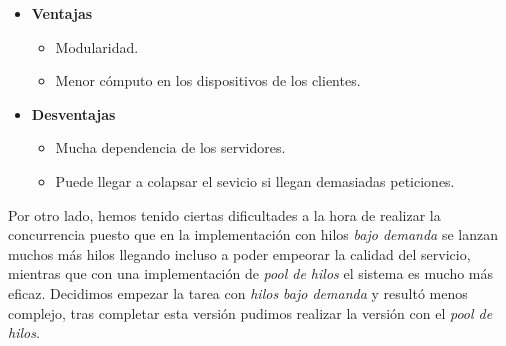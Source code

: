 \documentclass[10pt, spanish, pdftex]{template/UC3M_document}
\begin{document}
\begin{itemize}
  \item \textbf{Ventajas}
    \begin{itemize}
      \item Modularidad.
      \item Menor cómputo en los dispositivos de los clientes.
    \end{itemize}
  \item \textbf{Desventajas}
  \begin{itemize}
    \item Mucha dependencia de los servidores.
    \item Puede llegar a colapsar el sevicio si llegan demasiadas peticiones.
  \end{itemize}
\end{itemize}

Por otro lado, hemos tenido ciertas dificultades a la hora de realizar la concurrencia puesto que en la implementación con hilos \textit{bajo demanda} se lanzan muchos más hilos llegando incluso a poder empeorar la calidad del servicio, mientras que con una implementación de \textit{pool de hilos} el sistema es mucho más eficaz. Decidimos empezar la tarea con \textit{hilos bajo demanda} y resultó menos complejo, tras completar esta versión pudimos realizar la versión con el \textit{pool de hilos}.
\end{document}
